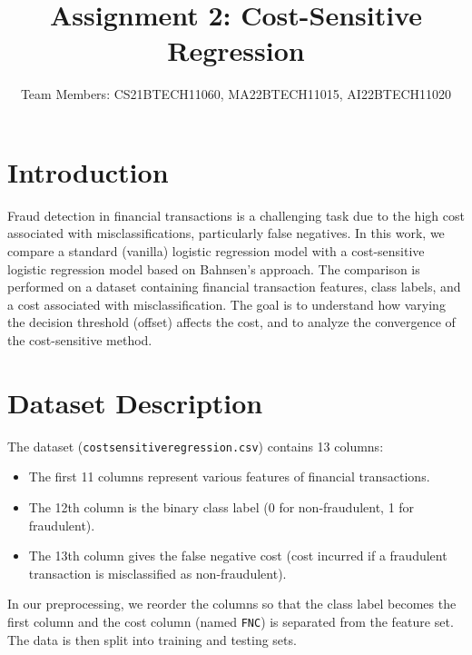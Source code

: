 \documentclass[11pt]{article}
\begin{document}
\title{Assignment 2: Cost-Sensitive Regression}
\author{Team Members: CS21BTECH11060, MA22BTECH11015, AI22BTECH11020}
\maketitle

\section{Introduction}
Fraud detection in financial transactions is a challenging task due to the high cost associated with misclassifications, particularly false negatives. In this work, we compare a standard (vanilla) logistic regression model with a cost-sensitive logistic regression model based on Bahnsen's approach. The comparison is performed on a dataset containing financial transaction features, class labels, and a cost associated with misclassification. The goal is to understand how varying the decision threshold (offset) affects the cost, and to analyze the convergence of the cost-sensitive method.

\section{Dataset Description}
The dataset (\texttt{costsensitiveregression.csv}) contains 13 columns:
\begin{itemize}
    \item The first 11 columns represent various features of financial transactions.
    \item The 12th column is the binary class label (0 for non-fraudulent, 1 for fraudulent).
    \item The 13th column gives the false negative cost (cost incurred if a fraudulent transaction is misclassified as non-fraudulent).
\end{itemize}
In our preprocessing, we reorder the columns so that the class label becomes the first column and the cost column (named \texttt{FNC}) is separated from the feature set. The data is then split into training and testing sets.
\end{document}
